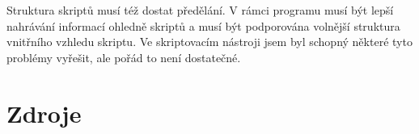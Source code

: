 \documentclass[12pt,a4paper]{article}
\begin{document}
Struktura skriptů musí též dostat předělání. V rámci programu musí být lepší nahrávání informací ohledně skriptů a musí být podporována volnější struktura vnitřního vzhledu skriptu. Ve skriptovacím nástroji jsem byl schopný některé tyto problémy vyřešit, ale pořád to není dostatečné. 

\section{Zdroje}
\end{document}
